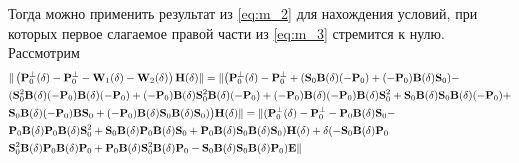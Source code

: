 \documentclass[fleqn]{article}
\renewcommand\b[1]{\mathbf{#1}}
\begin{document}
	Тогда можно применить результат из \eqref{eq:m_2} для нахождения условий, при которых первое слагаемое правой части из \eqref{eq:m_3} стремится к нулю. Рассмотрим
	\begin{align}
		&\|\left(\b{P}_0^\bot(\delta) - \b{P}_0^\bot - \b{W}_1(\delta) - \b{W}_2(\delta)\right)\b{H}(\delta)\| = \|\big(\b{P}_0^\bot(\delta) - \b{P}_0^\bot + (\b{S}_0\b{B}(\delta)(-\b{P}_0) + (-\b{P}_0)\b{B}(\delta)\b{S}_0) - \notag
		\\
		&(\b{S}^2_0\b{B}(\delta)(-\b{P}_0)\b{B}(\delta)(-\b{P}_0) +  (-\b{P}_0)\b{B}(\delta)\b{S}^2_0\b{B}(\delta)(-\b{P}_0) + (-\b{P}_0)\b{B}(\delta)(-\b{P}_0)\b{B}(\delta)\b{S}^2_0 + \b{S}_0\b{B}(\delta)\b{S}_0\b{B}(\delta)(-\b{P}_0) +\notag
		\\ 
		&\b{S}_0\b{B}(\delta)(-\b{P}_0)\b{B}\b{S}_0 + (-\b{P}_0)\b{B}(\delta)\b{S}_0\b{B}(\delta)\b{S}_0)\big)\b{H}(\delta)\| = \|(\b{P}_0^\bot(\delta) - \b{P}_0^\bot - \b{P}_0\b{B}(\delta)\b{S}_0 -\notag
		\\
		&\b{P}_0\b{B}(\delta)\b{P}_0\b{B}(\delta)\b{S}_0^2 + \b{S}_0\b{B}(\delta)\b{P}_0\b{B}(\delta)\b{S}_0 + \b{P}_0\b{B}(\delta)\b{S}_0\b{B}(\delta)\b{S}_0)\b{H}(\delta) + \delta(-\b{S}_0\b{B}(\delta)\b{P}_0\notag
		\\
		&\b{S}^2_0\b{B}(\delta)\b{P}_0\b{B}(\delta)\b{P}_0 +  \b{P}_0\b{B}(\delta)\b{S}^2_0\b{B}(\delta)\b{P}_0 - \b{S}_0\b{B}(\delta)\b{S}_0\b{B}(\delta)\b{P}_0 )\b{E}\|
	\end{align}
	
\end{document}
